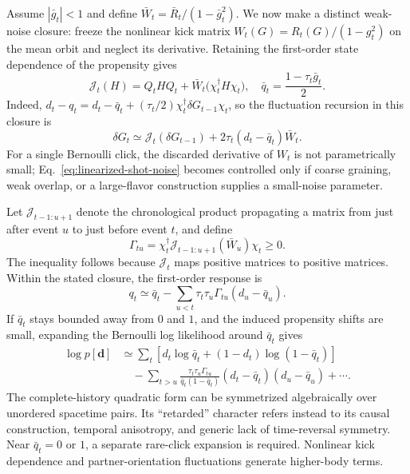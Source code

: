 \documentclass[
  aps,prx,twocolumn,superscriptaddress,longbibliography,
  nofootinbib,floatfix
]{revtex4-2}
\theoremstyle{plain}
\theoremstyle{definition}
\begin{document}
Assume \(|\bar g_t|<1\) and define
\(\bar W_t=\bar R_t/(1-\bar g_t^2)\).  We now make a distinct weak-noise
closure: freeze the nonlinear kick matrix \(W_t(G)=R_t(G)/(1-g_t^2)\) on the
mean orbit and neglect its derivative.  Retaining the first-order state
dependence of the propensity gives
\begin{equation}
 \mathcal J_t(H)
 =Q_tHQ_t+\bar W_t\bigl(\chi_t^\dagger H\chi_t\bigr),
 \quad
 \bar q_t=\frac{1-\tau_t\bar g_t}{2}.
 \label{eq:linearized-definitions}
\end{equation}
Indeed,
\(d_t-q_t=d_t-\bar q_t
+(\tau_t/2)\chi_t^\dagger\delta G_{t-1}\chi_t\), so the fluctuation recursion
in this closure is
\begin{equation}
 \delta G_t\simeq\mathcal J_t(\delta G_{t-1})
 +2\tau_t(d_t-\bar q_t)\bar W_t.
 \label{eq:linearized-shot-noise}
\end{equation}
For a single Bernoulli click, the discarded derivative of \(W_t\) is not
parametrically small; Eq.~\eqref{eq:linearized-shot-noise} becomes controlled
only if coarse graining, weak overlap, or a large-flavor construction supplies
a small-noise parameter.

Let \(\mathcal J_{t-1:u+1}\) denote the chronological product propagating a
matrix from just after event \(u\) to just before event \(t\), and define
\begin{equation}
 \Gamma_{tu}
 =\chi_t^\dagger
 \mathcal J_{t-1:u+1}(\bar W_u)\chi_t\geq0.
 \label{eq:retarded-kernel}
\end{equation}
The inequality follows because \(\mathcal J_t\) maps positive matrices to
positive matrices.  Within the stated closure, the first-order response is
\begin{equation}
 q_t\simeq\bar q_t
 -\sum_{u<t}\tau_t\tau_u\Gamma_{tu}(d_u-\bar q_u).
 \label{eq:q-retarded-response}
\end{equation}
If \(\bar q_t\) stays bounded away from \(0\) and \(1\), and the induced
propensity shifts are small, expanding the Bernoulli log likelihood around
\(\bar q_t\) gives
\begin{align}
 \log p[\bm d]
 &\simeq\sum_t\left[d_t\log\bar q_t
 +(1-d_t)\log(1-\bar q_t)\right]
 \nonumber\\
 &\quad-\sum_{t>u}
 \frac{\tau_t\tau_u\Gamma_{tu}}
 {\bar q_t(1-\bar q_t)}
 (d_t-\bar q_t)(d_u-\bar q_u)+\cdots .
 \label{eq:retarded-click-action}
\end{align}
The complete-history quadratic form can be symmetrized algebraically over
unordered spacetime pairs.  Its ``retarded'' character refers instead to its
causal construction, temporal anisotropy, and generic lack of time-reversal
symmetry.  Near \(\bar q_t=0\) or \(1\), a separate rare-click expansion is
required.  Nonlinear kick dependence and partner-orientation fluctuations
generate higher-body terms.
\end{document}
